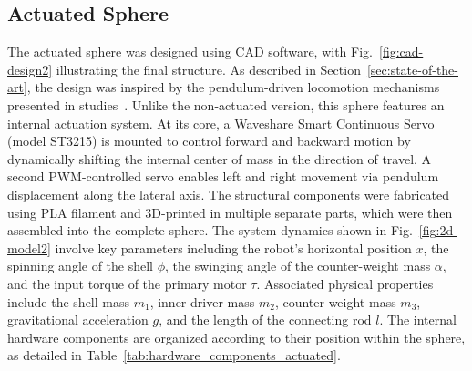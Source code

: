 \documentclass[a4paper, conference]{IEEEtran}
\begin{document}
\subsection{Actuated Sphere}
The actuated sphere was designed using CAD software, with Fig.~\ref{fig:cad-design2} illustrating the final structure. 
As described in Section~\ref{sec:state-of-the-art}, the design was inspired by the pendulum-driven locomotion mechanisms presented in studies~\cite{roboball, novelsphere}.
Unlike the non-actuated version, this sphere features an internal actuation system. 
At its core, a Waveshare Smart Continuous Servo (model ST3215) is mounted to control forward and backward motion by dynamically shifting the internal center of mass in the direction of travel. 
A second PWM-controlled servo enables left and right movement via pendulum displacement along the lateral axis.
The structural components were fabricated using PLA filament and 3D-printed in multiple separate parts, which were then assembled into the complete sphere.
The system dynamics shown in Fig.~\ref{fig:2d-model2} involve key parameters including the robot’s horizontal position \( x \), the spinning angle of the shell \( \phi \), the swinging angle of the counter-weight mass \( \alpha \), and the input torque of the primary motor \( \tau \). 
Associated physical properties include the shell mass \( m_1 \), inner driver mass \( m_2 \), counter-weight mass \( m_3 \), gravitational acceleration \( g \), and the length of the connecting rod \( l \). 
The internal hardware components are organized according to their position within the sphere, as detailed in Table~\ref{tab:hardware_components_actuated}.
\end{document}

